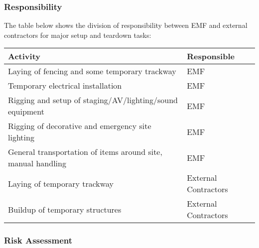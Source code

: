 \subsubsection{Responsibility}
The table below shows the division of responsibility between EMF and external contractors
for major setup and teardown tasks:

\begin{table}[h!]
\begin{tabular}{| p{10cm} | l |}
\hline
\textbf{Activity} & \textbf{Responsible} \\ \hline
Laying of fencing and some temporary trackway & EMF \\
Temporary electrical installation & EMF \\
Rigging and setup of staging/AV/lighting/sound equipment & EMF \\
Rigging of decorative and emergency site lighting & EMF \\
General transportation of items around site, manual handling & EMF \\
Laying of temporary trackway & External Contractors \\
Buildup of temporary structures & External Contractors \\
\hline
\end{tabular}
\end{table}

\subsubsection{Risk Assessment}

